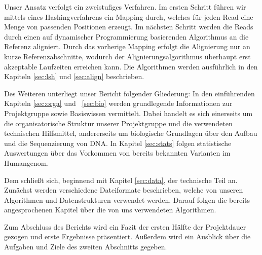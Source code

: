Unser Ansatz verfolgt ein zweistufiges Verfahren. Im ersten Schritt führen wir mittels eines Hashingverfahrens ein Mapping durch, welches für jeden Read eine Menge von passenden Positionen erzeugt. Im nächsten Schritt werden die Reads durch einen auf dynamischer Programmierung basierenden Algorithmus an die Referenz aligniert. Durch das vorherige Mapping erfolgt die Alignierung nur an kurze Referenzabschnitte, wodurch der Alignierungsalgorithmus überhaupt erst akzeptable Laufzeiten erreichen kann. Die Algorithmen werden ausführlich in den Kapiteln \ref{sec:lsh} und \ref{sec:align} beschrieben.

Des Weiteren unterliegt unser Bericht folgender Gliederung: In den einführenden Kapiteln \ref{sec:orga} und ~\ref{sec:bio} werden grundlegende Informationen zur Projektgruppe sowie Basiswissen vermittelt. Dabei handelt es sich einerseits um die organisatorische Struktur unserer Projektgruppe und die verwendeten technischen Hilfsmittel, andererseits um biologische Grundlagen über den Aufbau und die Sequenzierung von DNA. In Kapitel \ref{sec:stats} folgen statistische Auswertungen über das Vorkommen von bereits bekannten Varianten im Humangenom.

Dem schließt sich, beginnend mit Kapitel \ref{sec:data}, der technische Teil an. Zunächst werden verschiedene Dateiformate beschrieben, welche von unseren Algorithmen und Datenstrukturen verwendet werden. Darauf folgen die bereits angesprochenen Kapitel über die von uns verwendeten Algorithmen.

Zum Abschluss des Berichts wird ein Fazit der ersten Hälfte der Projektdauer gezogen und erste Ergebnisse präsentiert. Außerdem wird ein Ausblick über die Aufgaben und Ziele des zweiten Abschnitts gegeben. 